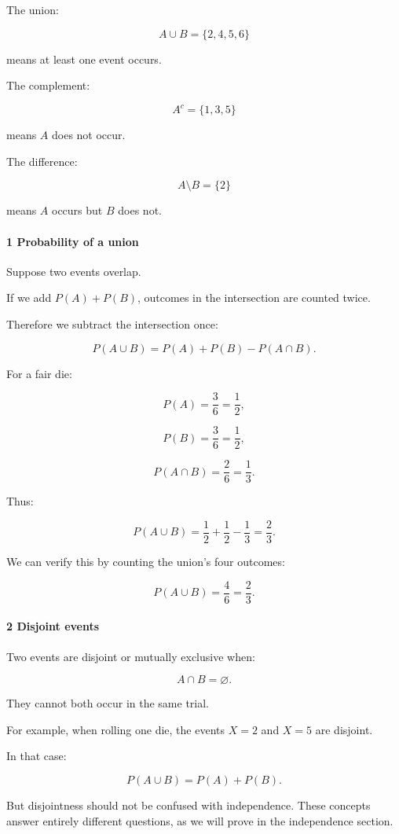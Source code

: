 The union:

\[
 A\cup B=\{2,4,5,6\}
\]

means at least one event occurs.

The complement:

\[
 A^c=\{1,3,5\}
\]

means \(A\) does not occur.

The difference:

\[
 A\setminus B=\{2\}
\]

means \(A\) occurs but \(B\) does not.

\paragraph{1 Probability of a union}\label{probability-of-a-union}

Suppose two events overlap.

If we add \(P(A)+P(B)\), outcomes in the intersection are counted twice.

Therefore we subtract the intersection once:

\[
 \boxed{ P(A\cup B) = P(A)+P(B)-P(A\cap B) }.
\]

For a fair die:

\[
 P(A)=\frac36=\frac12,
\]

\[
 P(B)=\frac36=\frac12,
\]

\[
 P(A\cap B)=\frac26=\frac13.
\]

Thus:

\[
 P(A\cup B) = \frac12+\frac12-\frac13 =\boxed{\frac23}.
\]

We can verify this by counting the union's four outcomes:

\[
 P(A\cup B)=\frac46=\frac23.
\]

\paragraph{2 Disjoint events}\label{disjoint-events}

Two events are disjoint or mutually exclusive when:

\[
 A\cap B=\varnothing.
\]

They cannot both occur in the same trial.

For example, when rolling one die, the events \(X=2\) and \(X=5\) are disjoint.

In that case:

\[
 P(A\cup B)=P(A)+P(B).
\]

But disjointness should not be confused with independence. These concepts answer entirely different questions, as we will prove in the independence section.

